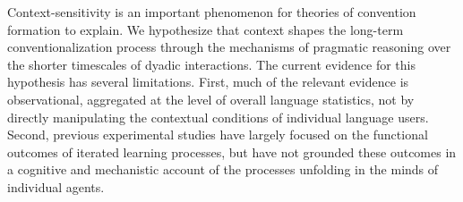Context-sensitivity is an important phenomenon for theories of convention formation to explain.
We hypothesize that context shapes the long-term conventionalization process through the mechanisms of pragmatic reasoning over the shorter timescales of dyadic interactions.
The current evidence for this hypothesis has several limitations. 
First, much of the relevant evidence is observational, aggregated at the level of overall language statistics, not by directly manipulating the contextual conditions of individual language users. 
Second, previous experimental studies have largely focused on the functional outcomes of iterated learning processes, but have not grounded these outcomes in a cognitive and mechanistic account of the processes unfolding in the minds of individual agents. 

